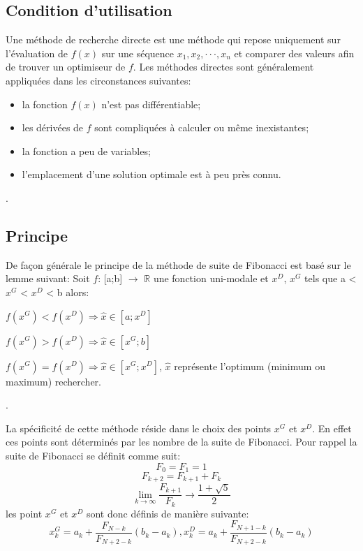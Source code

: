 \documentclass[a4paper,13pt]{article}
\begin{document}
\subsection{Condition d'utilisation}

Une méthode de recherche directe est une méthode qui repose uniquement sur l'évaluation de $f(x)$ sur une
séquence $x_{1}, x_{2}, · · ·, x_{n}$ et comparer des valeurs afin de trouver un optimiseur de $f$.
Les méthodes directes sont généralement appliquées dans les circonstances suivantes:
\begin{itemize} 
	\item la fonction $f(x)$ n'est pas différentiable;
    \item les dérivées de $f$ sont compliquées à calculer ou même inexistantes;
    \item la fonction a peu de variables;
    \item l'emplacement d'une solution optimale est à peu près connu.   
\end{itemize}.

\subsection{Principe}

De façon générale le principe de la méthode de suite de Fibonacci est basé sur le lemme suivant:
Soit $f$: [a;b] $\longrightarrow$ $\mathbb{R}$ une fonction uni-modale et $x^{D}$, $x^{G}$ tels que a < $x^{G}$ < $x^{D}$ < b alors:

\begin{list}{•}{ }
\item$f(x^{G}) < f(x^{D}) \Longrightarrow \widehat{x} \in [a; x^{D}]$
\item$f(x^{G}) > f(x^{D}) \Longrightarrow \widehat{x} \in [x^{G}; b]$
\item$f(x^{G}) = f(x^{D}) \Longrightarrow \widehat{x} \in [x^{G}; x^{D}]$, $\widehat{x}$ représente l'optimum (minimum ou maximum) rechercher.
\end{list}.

La spécificité de cette méthode réside dans le choix des points $x^{G}$ et $x^{D}$. En effet ces points sont déterminés par les nombre de la suite de Fibonacci. Pour rappel la suite de Fibonacci se définit comme suit:
	\[F_{0} = F_{1} = 1\]
	\[F_{k+2} = F_{k+1} + F_{k}\]
	\[\lim_{k\rightarrow\infty} \frac{F_{k+1}}{F_{k}} \longrightarrow \frac{1+\sqrt{5}}{2}\]
les point $x^{G}$ et $x^{D}$ sont donc définis de manière suivante: 
\[
	x^{G}_{k} = a_{k} + \frac{F_{N-k}}{F_{N+2-k}}(b_{k} - a_{k}), x^{D}_{k} = a_{k} + \frac{F_{N+1-k}}{F_{N+2-k}}(b_{k} - a_{k})
\]
\end{document}

